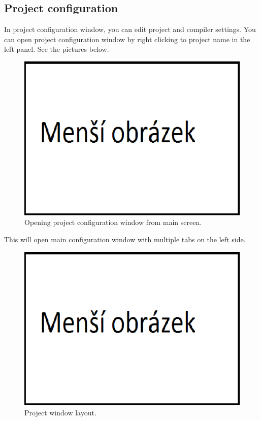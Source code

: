     
\clearpage
\enlargethispage{6\baselineskip}
\subsection{Project configuration}
    In project configuration window, you can edit project and compiler settings. You can open project configuration window by right clicking to project name in the left panel. See the pictures below.
    \begin{figure}[h]
        \centering{}
        \includegraphics[width=.9\textwidth]{img/mensi_obrazek.png}
        \caption{Opening project configuration window from main screen.}
    \end{figure}

    This will open main configuration window with multiple tabs on the left side.
    \begin{figure}[h!]
        \centering{}
        \includegraphics[width=.9\textwidth]{img/mensi_obrazek.png}
        \caption{Project window layout.}
    \end{figure}

